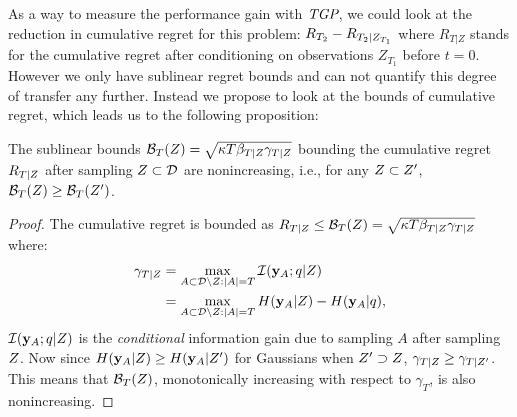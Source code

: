 As a way to measure the performance gain with $\emph{TGP}$, we could look at the reduction in cumulative regret for this problem: $R_{T_{2}} - R_{T_{2}|Z_{T_1}}$ where $R_{T|Z}$ stands for the cumulative regret after conditioning on observations $Z_{T_1}$ before $t = 0$. However we only have sublinear regret bounds and can not quantify this degree of transfer any further. Instead we propose to look at the bounds of cumulative regret, which leads us to the following proposition:

\begin{prop}\label{Proposition3}
The sublinear bounds $\mathcal{B}_T(Z) = \sqrt{\kappa T \beta_{T|Z} \gamma_{T|Z}}$ bounding the cumulative regret $R_{T|Z}$ after sampling $Z \subset \mathcal{D}$ are nonincreasing, i.e., for any $Z \subset Z'$, $\mathcal{B}_T(Z) \geq \mathcal{B}_T(Z')$.
\end{prop}

\begin{proof}
The cumulative regret is bounded as $R_{T|Z} \leq \mathcal{B}_T(Z) = \sqrt{\kappa T \beta_{T|Z} \gamma_{T|Z}}$ where:
\begin{align*}
\gamma_{T|Z}  &= \max_{A \subset \mathcal{D}\setminus Z: |A| = T} \mathcal{I}(\mathbf{y}_{A};q|Z) \\
&= \max_{A \subset \mathcal{D}\setminus Z: |A| = T} H(\mathbf{y}_{A}|Z) - H(\mathbf{y}_{A}|q),
\end{align*}
$\mathcal{I}(\mathbf{y}_{A};q|Z)$ is the \emph{conditional} information gain due to sampling $A$ after sampling $Z$. Now since  $H(\mathbf{y}_{A}|Z) \geq H(\mathbf{y}_{A}|Z') $  for Gaussians when $Z' \supset Z$, $\gamma_{T|Z} \geq \gamma_{T|Z'} $. This means that $\mathcal{B}_T(Z)$, monotonically increasing with respect to $\gamma_T$, is also nonincreasing.
\end{proof}

